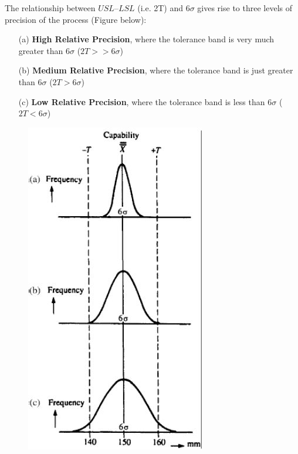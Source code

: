 \documentclass[MASTER-SPC.tex]{subfiles}
\begin{document}
\noindent	The relationship between $USL–LSL$ (i.e. 2T) and $6\sigma$ gives rise
	to three levels of precision of the process (Figure below):
	
	\begin{itemize}
		
		\item[(a)] \textbf{High Relative Precision}, where the tolerance band is very much greater
		than $6\sigma$ ($2T > > 6\sigma$) 
		
		\item[(b)] \textbf{Medium Relative Precision}, where the tolerance band is just greater than
		$6\sigma$ ($2T > 6\sigma$) 
		
		\item[(c)]\textbf{Low Relative Precision}, where the tolerance band is less than
		$6\sigma$ ($2T < 6\sigma$)
	\end{itemize}
\newpage
	\begin{figure}[h!]
		\centering
		\includegraphics[width=0.60\linewidth]{proccapindices/image1b}
	\end{figure}
	
	\newpage
\end{document}
